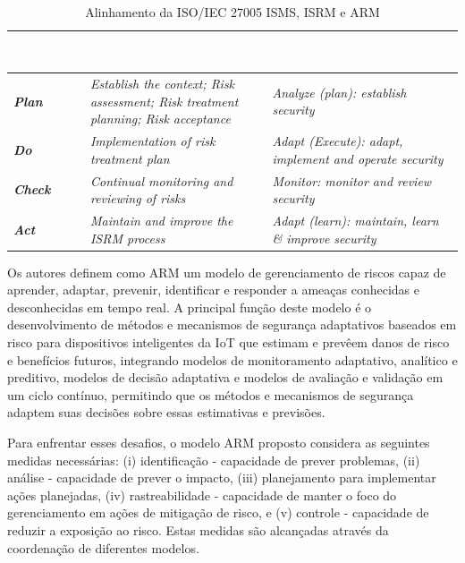 \documentclass[tid,table]{texufpel} %
\begin{document}
        \begin{table}[h]
        \centering
	\caption{Alinhamento da ISO/IEC 27005 ISMS, ISRM e ARM}
	\label{aligment-iso-27005}
	\begin{tabular}{p{2cm}|p{6cm}|p{6cm}}
	\rowcolor[HTML]{003366}
	\textcolor{white}{\textbf{Processo ISMS}} & \textcolor{white}{\textbf{Processo ISRM}} & \textcolor{white}{\textbf{Processo/Metodologia ARM Proposto}} \\
	\hline
	\cellcolor[HTML]{E5EAEA} \textbf{\textit{Plan}} & \textit{Establish the context; Risk assessment; Risk treatment planning; Risk acceptance} & \textit{Analyze (plan): establish security} \\
	\hline
	\cellcolor[HTML]{E5EAEA} \textbf{\textit{Do}} & \textit{Implementation of risk treatment plan} & \textit{Adapt (Execute): adapt, implement and operate security} \\
	\hline
	\cellcolor[HTML]{E5EAEA} \textbf{\textit{Check}} & \textit{Continual monitoring and reviewing of risks} & \textit{Monitor: monitor and review security} \\
	\hline
	\cellcolor[HTML]{E5EAEA} \textbf{\textit{Act}} & \textit{Maintain and improve the ISRM process} & \textit{Adapt (learn): maintain, learn \& improve security}
	\end{tabular}
	\end{table}

Os autores definem como ARM um modelo de gerenciamento de riscos capaz de aprender, adaptar, prevenir, identificar e responder a ameaças conhecidas e desconhecidas em tempo real. A principal função deste modelo é o desenvolvimento de métodos e mecanismos de segurança adaptativos baseados em risco para dispositivos inteligentes da IoT que estimam e prevêem danos de risco e benefícios futuros, integrando modelos de monitoramento adaptativo, analítico e preditivo, modelos de decisão adaptativa e modelos de avaliação e validação em um ciclo contínuo, permitindo que os métodos e mecanismos de segurança adaptem suas decisões sobre essas estimativas e previsões.

Para enfrentar esses desafios, o modelo ARM proposto considera as seguintes medidas necessárias: (i) identificação - capacidade de prever problemas, (ii) análise - capacidade de prever o impacto, (iii) planejamento para implementar ações planejadas, (iv) rastreabilidade - capacidade de manter o foco do gerenciamento em ações de mitigação de risco, e (v) controle - capacidade de reduzir a exposição ao risco. Estas medidas são alcançadas através da coordenação de diferentes modelos.
\end{document}
